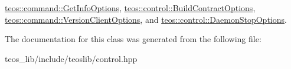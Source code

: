 \mbox{\hyperlink{classteos_1_1command_1_1_get_info_options_af5b6ec0a42f019ef1058e6f78a84346d}{teos\+::command\+::\+Get\+Info\+Options}}, \mbox{\hyperlink{classteos_1_1control_1_1_build_contract_options_ac45a323c2bc0c79b97b1d0d1d8afbf4f}{teos\+::control\+::\+Build\+Contract\+Options}}, \mbox{\hyperlink{classteos_1_1command_1_1_version_client_options_a28b69107e8eb50a2faf9594958bb1d6d}{teos\+::command\+::\+Version\+Client\+Options}}, and \mbox{\hyperlink{classteos_1_1control_1_1_daemon_stop_options_a99e7d5a47cd20e4ad437049263cd367a}{teos\+::control\+::\+Daemon\+Stop\+Options}}.



The documentation for this class was generated from the following file\+:\begin{DoxyCompactItemize}
\item 
teos\+\_\+lib/include/teoslib/control.\+hpp\end{DoxyCompactItemize}
